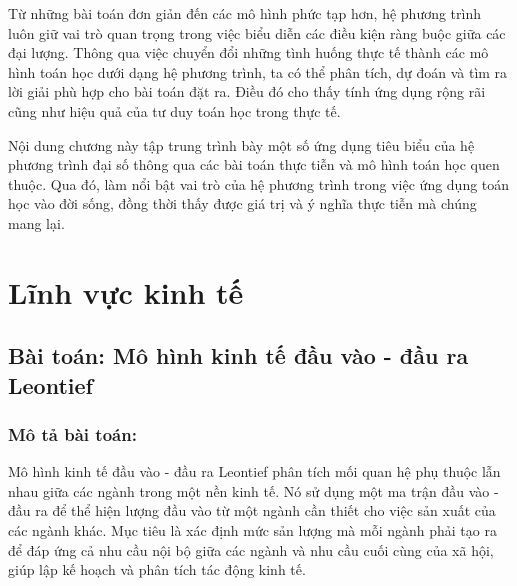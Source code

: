 \documentclass[12pt,a4paper,oneside]{book}
\theoremstyle{theorem}
\theoremstyle{definition}
\begin{document}
Từ những bài toán đơn giản đến các mô hình phức tạp hơn, hệ phương trình
luôn giữ vai trò quan trọng trong việc biểu diễn các điều kiện ràng buộc giữa
các đại lượng. Thông qua việc chuyển đổi những tình huống thực tế thành các
mô hình toán học dưới dạng hệ phương trình, ta có thể phân tích, dự đoán và
tìm ra lời giải phù hợp cho bài toán đặt ra. Điều đó cho thấy tính ứng dụng rộng
rãi cũng như hiệu quả của tư duy toán học trong thực tế.

Nội dung chương này tập trung trình bày một số ứng dụng tiêu biểu của hệ
phương trình đại số thông qua các bài toán thực tiễn và mô hình toán học quen
thuộc. Qua đó, làm nổi bật vai trò của hệ phương trình trong việc ứng dụng toán
học vào đời sống, đồng thời thấy được giá trị và ý nghĩa thực tiễn mà chúng
mang lại.

\section{Lĩnh vực kinh tế}
\subsection{Bài toán: Mô hình kinh tế đầu vào - đầu ra Leontief}
\subsubsection{Mô tả bài toán:}
  Mô hình kinh tế đầu vào - đầu ra Leontief phân tích mối quan hệ phụ thuộc lẫn nhau giữa các ngành trong một nền kinh tế. Nó sử dụng một ma trận đầu vào - đầu ra để thể hiện lượng đầu vào từ một ngành cần thiết cho việc sản xuất của các ngành khác. Mục tiêu là xác định mức sản lượng mà mỗi ngành phải tạo ra để đáp ứng cả nhu cầu nội bộ giữa các ngành và nhu cầu cuối cùng của xã hội, giúp lập kế hoạch và phân tích tác động kinh tế.
\end{document}
